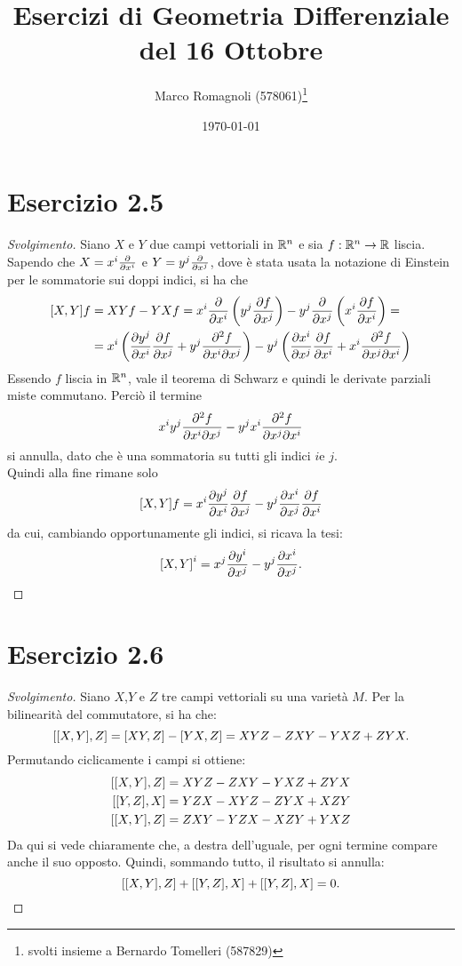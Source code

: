 \documentclass[italian,a4paper,11pt]{article}
\title{Esercizi di Geometria Differenziale\\ del 16 Ottobre}
\author{Marco Romagnoli (578061)\thanks{svolti insieme a Bernardo Tomelleri (587829)}}
\date{\today}
\begin{document}
\maketitle

\section*{Esercizio 2.5}
\begin{proof}[Svolgimento]
Siano $X$ e $Y$ due campi vettoriali in $\mathbb R^n$ e sia $f:\mathbb R^n \rightarrow \mathbb R$ liscia. Sapendo che $X = x^i \pdv{}{x^i}$ e $Y = y^j \pdv{}{x^j}$, dove è stata usata la notazione di Einstein per le sommatorie sui doppi indici, si ha che 
\begin{align*}
\comm{X}{Y}f &= XYf - YXf = x^i \pdv{}{x^i}\left(y^j \pdv{f}{x^j}\right) - y^j \pdv{}{x^j}\left(x^i \pdv{f}{x^i}\right) = \\
&= x^i \left(\pdv{y^j}{x^i} \pdv{f}{x^j} + y^j \pdv[2]{f}{x^i}{x^j}\right) - y^j \left(\pdv{x^i}{x^j} \pdv{f}{x^i} + x^i \pdv[2]{f}{x^j}{x^i}\right)
\end{align*}
Essendo $f$ liscia in $\mathbb R^n$, vale il teorema di Schwarz e quindi le derivate parziali miste commutano. Perciò il termine $$x^iy^j  \pdv[2]{f}{x^i}{x^j} - y^jx^i  \pdv[2]{f}{x^j}{x^i}$$ si annulla, dato che è una sommatoria su tutti gli indici $i$e $j$.\\
Quindi alla fine rimane solo $$\comm{X}{Y}f = x^i \pdv{y^j}{x^i} \pdv{f}{x^j} - y^j \pdv{x^i}{x^j} \pdv{f}{x^i}$$ da cui, cambiando opportunamente gli indici, si ricava la tesi: $$\comm{X}{Y}^i = x^j \pdv{y^i}{x^j} - y^j \pdv{x^i}{x^j}.$$  
\end{proof}

\section*{Esercizio 2.6}
\begin{proof}[Svolgimento]
Siano $X$,$Y$ e $Z$ tre campi vettoriali su una varietà $M$. Per la bilinearità del commutatore, si ha che:
\begin{equation*}
\comm{\comm{X}{Y}}{Z} = \comm{XY}{Z} - \comm{YX}{Z} = XYZ - ZXY - YXZ + ZYX.
\end{equation*}
Permutando ciclicamente i campi si ottiene:
\begin{align*}
\comm{\comm{X}{Y}}{Z} &= XYZ - ZXY - YXZ + ZYX\\
\comm{\comm{Y}{Z}}{X} &= YZX - XYZ - ZYX + XZY\\
\comm{\comm{X}{Y}}{Z} &= ZXY - YZX - XZY + YXZ
\end{align*}
Da qui si vede chiaramente che, a destra dell'uguale, per ogni termine compare anche il suo opposto. Quindi, sommando tutto, il risultato si annulla: $$\comm{\comm{X}{Y}}{Z} + \comm{\comm{Y}{Z}}{X} + \comm{\comm{Y}{Z}}{X} = 0.$$ 
\end{proof}
\end{document}

